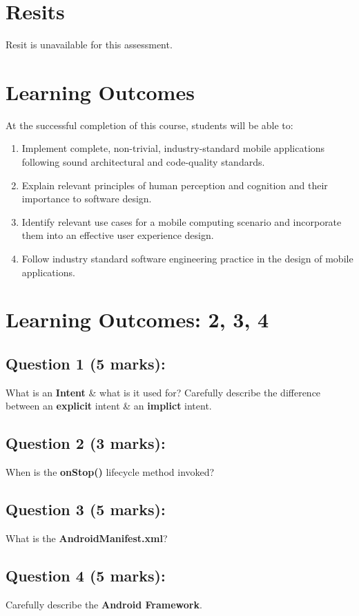 \documentclass{article}
\begin{document}
\section*{Resits} 
Resit is unavailable for this assessment.

\section*{Learning Outcomes}
At the successful completion of this course, students will be able to:
\begin{enumerate}
	\item Implement complete, non-trivial, industry-standard mobile applications following sound architectural and code-quality standards.
	\item Explain relevant principles of human perception and cognition and their importance to software design.
	\item Identify relevant use cases for a mobile computing scenario and incorporate them into an effective user experience design.
	\item Follow industry standard software engineering practice in the design of mobile applications.
\end{enumerate}

\newpage

\section*{Learning Outcomes: 2, 3, 4}

\subsection*{Question 1 (5 marks):}
What is an \textbf{Intent} \& what is it used for? Carefully describe the difference between an \textbf{explicit} intent \& an \textbf{implict} intent.

\subsection*{Question 2 (3 marks):}
When is the \textbf{onStop()} lifecycle method invoked?

\subsection*{Question 3 (5 marks):}
What is the \textbf{AndroidManifest.xml}?

\subsection*{Question 4 (5 marks):}
Carefully describe the \textbf{Android Framework}.
\end{document}

